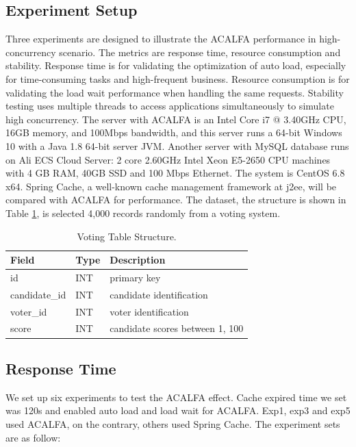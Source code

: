 \documentclass{singlecol-new}
\theoremstyle{TH}{
\newtheorem{lemma}{Lemma}
\newtheorem{theorem}[lemma]{Theorem}
\newtheorem{corrolary}[lemma]{Corrolary}
\newtheorem{conjecture}[lemma]{Conjecture}
\newtheorem{proposition}[lemma]{Proposition}
\newtheorem{claim}[lemma]{Claim}
\newtheorem{stheorem}[lemma]{Wrong Theorem}
}
\theoremstyle{THrm}{
\newtheorem{definition}{Definition}[section]
\newtheorem{question}{Question}[section]
\newtheorem{remark}{Remark}
\newtheorem{scheme}{Scheme}
}
\theoremstyle{THhit}{
\newtheorem{case}{Case}[section]
}
\begin{document}
\subsection{Experiment Setup}
Three experiments are designed to illustrate the ACALFA performance in high-concurrency scenario. The metrics are response time, resource consumption and stability. Response time is for validating the optimization of auto load, especially for time-consuming tasks and high-frequent business. Resource consumption is for validating the load wait performance when handling the same requests. Stability testing uses multiple threads to access applications simultaneously to simulate high concurrency. The server with ACALFA is an Intel Core i7 @ 3.40GHz CPU, 16GB memory, and 100Mbps bandwidth, and this server runs a 64-bit Windows 10 with a Java 1.8 64-bit server JVM. Another server with MySQL database runs on Ali ECS Cloud Server: 2 core 2.60GHz Intel Xeon E5-2650 CPU machines with 4 GB RAM, 40GB SSD and 100 Mbps Ethernet. The system is CentOS 6.8 x64. Spring Cache, a well-known cache management framework at j2ee, will be compared with ACALFA for performance. The dataset, the structure is shown in Table \ref{VTS}, is selected 4,000 records randomly from a voting system.

\begin{table}[htb]
\begin{center}
 \caption{\label{VTS}Voting Table Structure.}
 \begin{tabular}{lll}
 \toprule
    Field & Type & Description\\
 \midrule
    id & INT & primary key\\
    candidate\_id & INT & candidate identification\\
    voter\_id & INT & voter identification\\
    score & INT & candidate scores between 1, 100\\
\bottomrule
 \end{tabular}
\end{center}
\end{table}

\subsection{Response Time}

We set up six experiments to test the ACALFA effect. Cache expired time we set was 120s and enabled auto load and load wait for ACALFA. Exp1, exp3 and exp5 used ACALFA, on the contrary, others used Spring Cache. The experiment sets are as follow:
\end{document}
